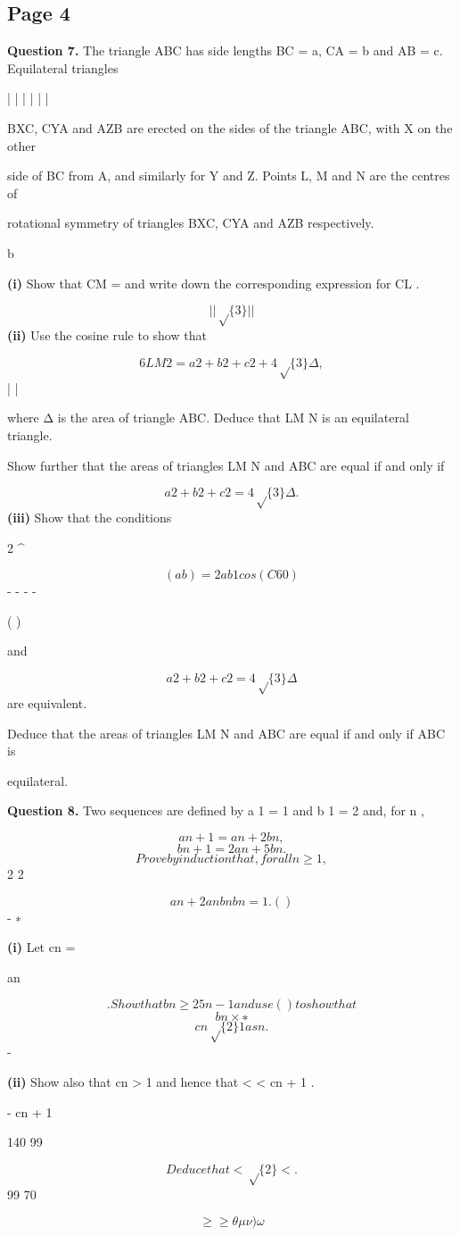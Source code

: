 \documentclass[12pt]{article}
\begin{document}
\subsection*{Page 4}
\begin{flushleft}
\bigskip\textbf{Question 7.} The triangle ABC has side lengths BC = a, CA = b and AB = c. Equilateral triangles\par
| | | | | |\par
BXC, CYA and AZB are erected on the sides of the triangle ABC, with X on the other\par
side of BC from A, and similarly for Y and Z. Points L, M and N are the centres of\par
rotational symmetry of triangles BXC, CYA and AZB respectively.\par
b\par
\textbf{(i)} Show that CM = and write down the corresponding expression for CL .\par
\[| | \sqrt\{3\} | |\]
\textbf{(ii)} Use the cosine rule to show that\par
\[6 LM 2 = a 2 + b 2 + c 2 + 4\sqrt\{3\} Δ ,\]
| |\par
where Δ is the area of triangle ABC. Deduce that LM N is an equilateral triangle.\par
Show further that the areas of triangles LM N and ABC are equal if and only if\par
\[a 2 + b 2 + c 2 = 4\sqrt\{3\} Δ .\]
\textbf{(iii)} Show that the conditions\par
2 \textasciicircum{}\circ\par
\[(a b) = 2ab 1 cos(C 60 )\]
- - - -\par
( )\par
and\par
\[a 2 + b 2 + c 2 = 4\sqrt\{3\} Δ\]
are equivalent.\par
Deduce that the areas of triangles LM N and ABC are equal if and only if ABC is\par
equilateral.\par
\bigskip\textbf{Question 8.} Two sequences are defined by a 1 = 1 and b 1 = 2 and, for n ,\par
\[an+1 = an + 2bn ,\]
\[bn+1 = 2an + 5bn .\]
\[Prove by induction that, for all n \geq 1,\]
2 2\par
\[a n + 2anbn b n = 1 . ( )\]
- ∗\par
\textbf{(i)} Let cn =\par
an\par
\[. Show that bn \geq 2 5 n-1 and use ( ) to show that\]
\[bn \times ∗\]
\[cn \sqrt\{2\} 1 as n .\]
\to - \to \infty\par
\textbf{(ii)} Show also that cn >  1 and hence that <  < cn + 1 .\par
- cn + 1\par
140 99\par
\[Deduce that < \sqrt\{2\} < .\]
99 70\par
\[\geq\geq\theta\mu\nu) \omega\]
\end{flushleft}
\end{document}

